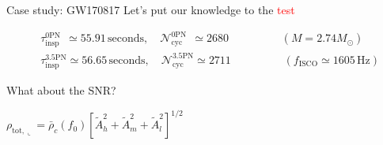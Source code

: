 \documentclass[xcolor=dvipsnames,handout,t]{beamer}
\newcommand{\red}[1]{\textcolor{red}{#1}}
\begin{document}
\begin{frame}{Case study: GW170817}  {Let's put our knowledge to the \red{test}}
\vspace{-7mm}
  \begin{footnotesize}
    \begin{align*}
      &\tau_\text{insp}^{0\text{PN}} \ \ \simeq 55.91\,\text{seconds}, \quad \mathcal{N}_\text{cyc}^{0\text{PN}} \ \ \simeq 2680 \hspace{2cm} (M=2.74 M_\odot) \\
      &\tau_\text{insp}^{3.5\text{PN}} \simeq 56.65\,\text{seconds}, \quad \mathcal{N}_\text{cyc}^{3.5\text{PN}} \simeq 2711 \hspace{2cm} (f_\text{ISCO}\simeq 1605\,\text{Hz}) 
    \end{align*}
  \end{footnotesize}
  {
  What about the SNR? \quad
  \begin{small}$\rho_{\text{tot},\llcorner}  = {\bar\rho_c(f_0)\left[\tilde{A}_h^2 + \tilde{A}_m^2 + \tilde{A}_l^2 \right]^{1/2}}$   
  \end{small}
  }
  

\end{frame}
\end{document}
